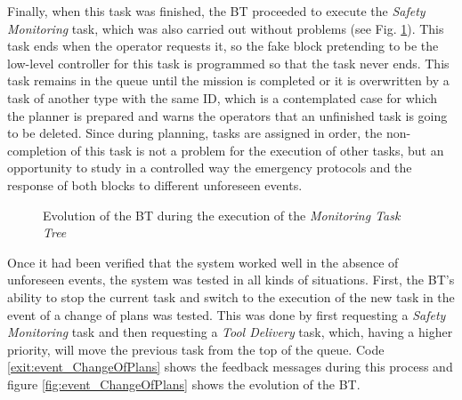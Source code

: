 Finally, when this task was finished, the \gls{BT} proceeded to execute the \emph{Safety Monitoring} task, which was also carried out without problems (see Fig. \ref{fig:Gazebo_MonitorTree}). This task ends when the operator requests it, so the fake block pretending to be the low-level controller for this task is programmed so that the task never ends. This task remains in the queue until the mission is completed or it is overwritten by a task of another type with the same \gls{ID}, which is a contemplated case for which the planner is prepared and warns the operators that an unfinished task is going to be deleted. Since during planning, tasks are assigned in order, the non-completion of this task is not a problem for the execution of other tasks, but an opportunity to study in a controlled way the emergency protocols and the response of both blocks to different unforeseen events.

\begin{figure}[htbp]
    \centering
    \hfill
    \caption{Evolution of the \gls{BT} during the execution of the \emph{Monitoring Task Tree}}
    \label{fig:Gazebo_MonitorTree}
\end{figure}

Once it had been verified that the system worked well in the absence of unforeseen events, the system was tested in all kinds of situations. First, the \gls{BT}'s ability to stop the current task and switch to the execution of the new task in the event of a change of plans was tested. This was done by first requesting a \emph{Safety Monitoring} task and then requesting a \emph{Tool Delivery} task, which, having a higher priority, will move the previous task from the top of the queue. Code \ref{exit:event_ChangeOfPlans} shows the feedback messages during this process and figure \ref{fig:event_ChangeOfPlans} shows the evolution of the \gls{BT}.

